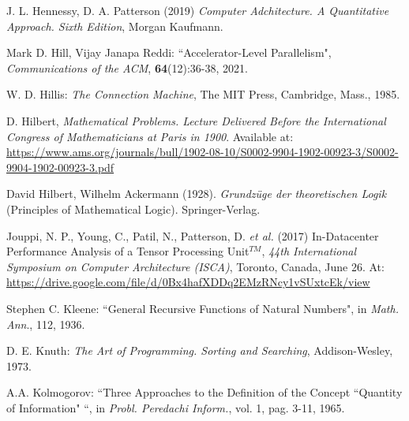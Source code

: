 {\begin{thebibliography}{}
 J. L. Hennessy, D. A. Patterson (2019) {\it Computer Adchitecture. A Quantitative Approach. Sixth Edition}, Morgan Kaufmann.



 Mark D. Hill, Vijay Janapa Reddi: ``Accelerator-Level Parallelism", {\em Communications of the ACM}, {\bf 64}(12):36-38, 2021.

 W. D. Hillis: {\em The Connection Machine}, The MIT Press, Cambridge, Mass., 1985.

 D. Hilbert, {\em Mathematical Problems. Lecture Delivered Before the International Congress of Mathematicians at Paris in 1900}.    Available at:  \url{https://www.ams.org/journals/bull/1902-08-10/S0002-9904-1902-00923-3/S0002-9904-1902-00923-3.pdf}

    David Hilbert, Wilhelm Ackermann (1928). {\em Grundzüge der theoretischen Logik} (Principles of Mathematical Logic). Springer-Verlag.



  Jouppi, N. P., Young, C., Patil, N., Patterson, D. {\em et al.} (2017) In-Datacenter Performance Analysis of a Tensor Processing Unit$^{TM}$, {\em 44th International Symposium on Computer Architecture (ISCA)}, Toronto, Canada, June 26.
    At: \url{https://drive.google.com/file/d/0Bx4hafXDDq2EMzRNcy1vSUxtcEk/view}

 Stephen C. Kleene: ``General Recursive Functions of
 Natural Numbers", in {\em Math. Ann}., 112, 1936.


 D. E. Knuth: {\em The Art of Programming. Sorting and Searching}, Addison-Wesley, 1973.

 A.A. Kolmogorov: ``Three Approaches to the
Definition of the Concept ``Quantity of Information" ``, in {\em
Probl. Peredachi Inform.}, vol. 1, pag. 3-11, 1965.


\end{thebibliography}}
